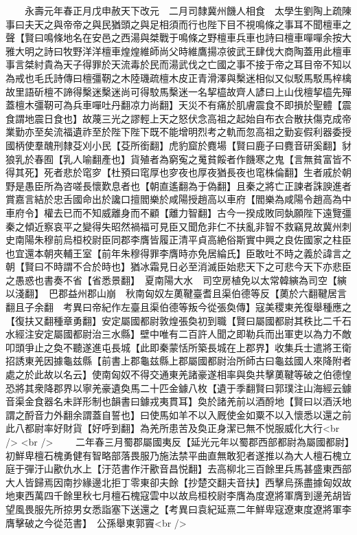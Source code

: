 　　永壽元年春正月戊申赦天下改元　二月司隸冀州饑人相食　太學生劉陶上疏陳事曰夫天之與帝帝之與民猶頭之與足相須而行也陛下目不視鳴條之事耳不聞檀車之聲【賢曰鳴條地名在安邑之西湯與桀戰于鳴條之野檀車兵車也詩曰檀車嘽嘽余按大雅大明之詩曰牧野洋洋檀車煌煌維師尚父時維鷹揚凉彼武王肆伐大商陶蓋用此檀車事言桀紂貴為天子得罪於天流毒於民而湯武伐之亡國之事不接于帝之耳目帝不知以為戒也毛氏詩傳曰檀彊靭之木陸璣疏檀木皮正青滑澤與檕迷相似又似駁馬駁馬梓檎故里語斫檀不諦得檕迷檕迷尚可得駮馬檕迷一名挈橀故齊人諺曰上山伐檀挈橀先殫蓋檀木彊靭可為兵車嘽吐丹翻凉力尚翻】天災不有痛於肌膚震食不即損於聖體【震食謂地震日食也】故蔑三光之謬輕上天之怒伏念高祖之起始自布衣合散扶傷克成帝業勤亦至矣流福遺祚至於陛下陛下既不能增明烈考之軌而忽高祖之勤妄假利器委授國柄使羣醜刑隸芟刈小民【芟所銜翻】虎豹窟於麑場【賢曰鹿子曰麑音研奚翻】豺狼乳於春囿【乳人喻翻產也】貨殖者為窮寃之䰟貧餒者作饑寒之鬼【言無貧富皆不得其死】死者悲於窀穸【杜預曰窀厚也穸夜也厚夜猶長夜也窀株倫翻】生者戚於朝野是愚臣所為咨嗟長懷歎息者也【朝直遙翻為于偽翻】且秦之將亡正諫者誅諛進者賞嘉言結於忠舌國命出於讒口擅閻樂於咸陽授趙高以車府【閻樂為咸陽令趙高為中車府令】權去已而不知威離身而不顧【離力智翻】古今一揆成敗同埶願陛下遠覽彊秦之傾近察哀平之變得失昭然禍福可見臣又聞危非仁不扶亂非智不救竊見故冀州刺史南陽朱穆前烏桓校尉臣同郡李膺皆履正清平貞高絶俗斯實中興之良佐國家之柱臣也宜還本朝夾輔王室【前年朱穆得罪李膺時亦免居綸氏】臣敢吐不時之義於諱言之朝【賢曰不時謂不合於時也】猶冰霜見日必至消滅臣始悲天下之可悲今天下亦悲臣之愚惑也書奏不省【省悉景翻】　夏南陽大水　司空房植免以太常韓縯為司空【縯以淺翻】　巴郡益州郡山崩　秋南匈奴左薁鞬臺耆且渠伯德等反【薁於六翻鞬居言翻且子余翻　考異曰帝紀作左臺且渠伯德等叛今從張奐傳】寇美稷東羌復舉種應之【復扶又翻種章勇翻】安定屬國都尉敦煌張奐初到職【賢曰屬國都尉其秩比二千石水經注安定屬國都尉治三水縣】壁中唯有二百許人聞之即勒兵而出軍吏以為力不敵叩頭爭止之奐不聽遂進屯長城【此即秦蒙恬所築長城在上郡界】收集兵士遣將王衛招誘東羌因據龜兹縣【前書上郡龜兹縣上郡屬國都尉治所師古曰龜兹國人來降附者處之於此故以名云】使南匈奴不得交通東羌諸豪遂相率與奐共擊薁鞬等破之伯德惶恐將其衆降郡界以寧羌豪遺奐馬二十匹金鐻八枚【遺于季翻賢曰郭璞注山海經云鐻音渠金食器名未詳形制也韻書曰鐻戎夷貫耳】奐於諸羌前以酒酹地【賢曰以酒沃地謂之酹音力外翻余謂蓋自誓也】曰使馬如羊不以入厩使金如粟不以入懷悉以還之前此八都尉率好財貨【好呼到翻】為羌所患苦及奐正身潔已無不悦服威化大行<br />
<br />
　　二年春三月蜀郡屬國夷反【延光元年以蜀郡西部都尉為屬國都尉】　初鮮卑檀石槐勇健有智略部落畏服乃施法禁平曲直無敢犯者遂推以為大人檀石槐立庭于彈汙山歠仇水上【汙范書作汗歠音昌悦翻】去高柳北三百餘里兵馬甚盛東西部大人皆歸焉因南抄緣邊北拒丁零東卻夫餘【抄楚交翻夫音扶】西擊烏孫盡據匈奴故地東西萬四千餘里秋七月檀石槐寇雲中以故烏桓校尉李膺為度遼將軍膺到邊羌胡皆望風畏服先所掠男女悉詣塞下送還之【考異曰袁紀延熹二年鮮卑寇遼東度遼將軍李膺擊破之今從范書】　公孫舉東郭竇<br />
